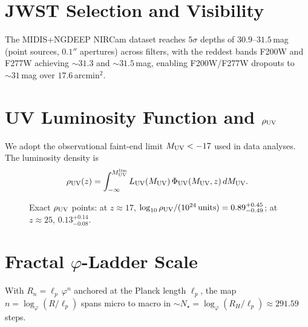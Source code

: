 \documentclass[aps,prd,reprint,onecolumn,nofootinbib]{revtex4-2}
\begin{document}
\section{JWST Selection and Visibility}
The MIDIS+NGDEEP NIRCam dataset reaches $5\sigma$ depths of $30.9$--$31.5$\,mag (point sources, $0.1''$ apertures) across filters, with the reddest bands F200W and F277W achieving $\sim31.3$ and $\sim31.5$\,mag, enabling F200W/F277W dropouts to $\sim31$\,mag over $17.6$\,arcmin$^2$.

\section{UV Luminosity Function and $\rho_{\rm UV}$}
We adopt the observational faint-end limit $M_{\rm UV}<-17$ used in data analyses. The luminosity density is
\begin{equation}
\rho_{\rm UV}(z)=\int_{-\infty}^{M_{\rm UV}^{\rm lim}} L_{\rm UV}(M_{\rm UV})\,\Phi_{\rm UV}(M_{\rm UV},z)\,dM_{\rm UV}.
\end{equation}

\begin{figure}[t]
\centering
{}
\caption{Exact $\rho_{\rm UV}$ points: at $z\approx17$, $\log_{10}\rho_{\rm UV}/(10^{24}\,\mathrm{units})=0.89^{+0.45}_{-0.49}$; at $z\approx25$, $0.13^{+0.14}_{-0.08}$.}
\end{figure}

\section{Fractal $\varphi$-Ladder Scale}
With $R_n=\ell_p\,\varphi^n$ anchored at the Planck length $\ell_p$, the map $n=\log_\varphi(R/\ell_p)$ spans micro to macro in $\sim N_\star=\log_\varphi(R_H/\ell_p)\approx 291.59$ steps.
\end{document}
